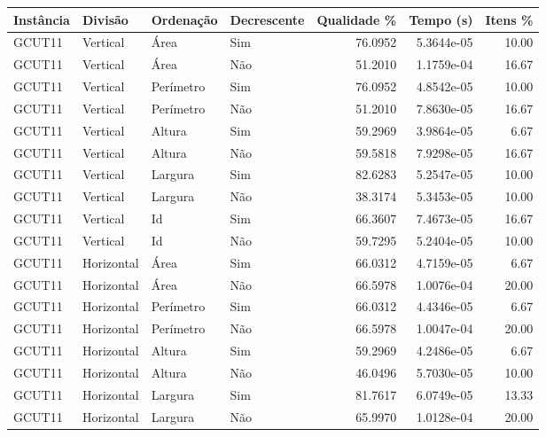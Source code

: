 \begin{tabular}{llllrrr}
    \hline
    Instância & Divisão     & Ordenação & Decrescente & Qualidade \% & Tempo (s)  & Itens \% \\
    \hline
    GCUT11    & Vertical    & Área      & Sim         & 76.0952      & 5.3644e-05 & 10.00    \\
    GCUT11    & Vertical    & Área      & Não         & 51.2010      & 1.1759e-04 & 16.67    \\
    GCUT11    & Vertical    & Perímetro & Sim         & 76.0952      & 4.8542e-05 & 10.00    \\
    GCUT11    & Vertical    & Perímetro & Não         & 51.2010      & 7.8630e-05 & 16.67    \\
    GCUT11    & Vertical    & Altura    & Sim         & 59.2969      & 3.9864e-05 & 6.67     \\
    GCUT11    & Vertical    & Altura    & Não         & 59.5818      & 7.9298e-05 & 16.67    \\
    GCUT11    & Vertical    & Largura   & Sim         & 82.6283      & 5.2547e-05 & 10.00    \\
    GCUT11    & Vertical    & Largura   & Não         & 38.3174      & 5.3453e-05 & 10.00    \\
    GCUT11    & Vertical    & Id        & Sim         & 66.3607      & 7.4673e-05 & 16.67    \\
    GCUT11    & Vertical    & Id        & Não         & 59.7295      & 5.2404e-05 & 10.00    \\
    GCUT11    & Horizontal  & Área      & Sim         & 66.0312      & 4.7159e-05 & 6.67     \\
    GCUT11    & Horizontal  & Área      & Não         & 66.5978      & 1.0076e-04 & 20.00    \\
    GCUT11    & Horizontal  & Perímetro & Sim         & 66.0312      & 4.4346e-05 & 6.67     \\
    GCUT11    & Horizontal  & Perímetro & Não         & 66.5978      & 1.0047e-04 & 20.00    \\
    GCUT11    & Horizontal  & Altura    & Sim         & 59.2969      & 4.2486e-05 & 6.67     \\
    GCUT11    & Horizontal  & Altura    & Não         & 46.0496      & 5.7030e-05 & 10.00    \\
    GCUT11    & Horizontal  & Largura   & Sim         & 81.7617      & 6.0749e-05 & 13.33    \\
    GCUT11    & Horizontal  & Largura   & Não         & 65.9970      & 1.0128e-04 & 20.00    \\

\end{tabular}
